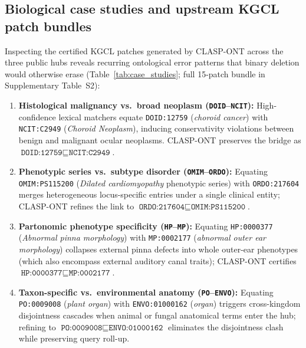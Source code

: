 \documentclass[10pt]{article}
\theoremstyle{accentdef}
\begin{document}
\subsection*{Biological case studies and upstream KGCL patch bundles}

Inspecting the certified KGCL patches generated by \textsc{CLASP-ONT} across the three public hubs reveals recurring ontological error patterns that binary deletion would otherwise erase (Table~\ref{tab:case_studies}; full 15-patch bundle in Supplementary Table~S2):
\begin{enumerate}
  \item \textbf{Histological malignancy vs.\ broad neoplasm (\texttt{DOID}--\texttt{NCIT}):} High-confidence lexical matchers equate \texttt{DOID:12759} (\emph{choroid cancer}) with \texttt{NCIT:C2949} (\emph{Choroid Neoplasm}), inducing conservativity violations between benign and malignant ocular neoplasms. \textsc{CLASP-ONT} preserves the bridge as $\texttt{DOID:12759} \sqsubseteq \texttt{NCIT:C2949}$.
  \item \textbf{Phenotypic series vs.\ subtype disorder (\texttt{OMIM}--\texttt{ORDO}):} Equating \texttt{OMIM:PS115200} (\emph{Dilated cardiomyopathy} phenotypic series) with \texttt{ORDO:217604} merges heterogeneous locus-specific entries under a single clinical entity; \textsc{CLASP-ONT} refines the link to $\texttt{ORDO:217604} \sqsubseteq \texttt{OMIM:PS115200}$.
  \item \textbf{Partonomic phenotype specificity (\texttt{HP}--\texttt{MP}):} Equating \texttt{HP:0000377} (\emph{Abnormal pinna morphology}) with \texttt{MP:0002177} (\emph{abnormal outer ear morphology}) collapses external pinna defects into whole outer-ear phenotypes (which also encompass external auditory canal traits); \textsc{CLASP-ONT} certifies $\texttt{HP:0000377} \sqsubseteq \texttt{MP:0002177}$.
  \item \textbf{Taxon-specific vs.\ environmental anatomy (\texttt{PO}--\texttt{ENVO}):} Equating \texttt{PO:0009008} (\emph{plant organ}) with \texttt{ENVO:01000162} (\emph{organ}) triggers cross-kingdom disjointness cascades when animal or fungal anatomical terms enter the hub; refining to $\texttt{PO:0009008} \sqsubseteq \texttt{ENVO:01000162}$ eliminates the disjointness clash while preserving query roll-up.
\end{enumerate}
\end{document}

